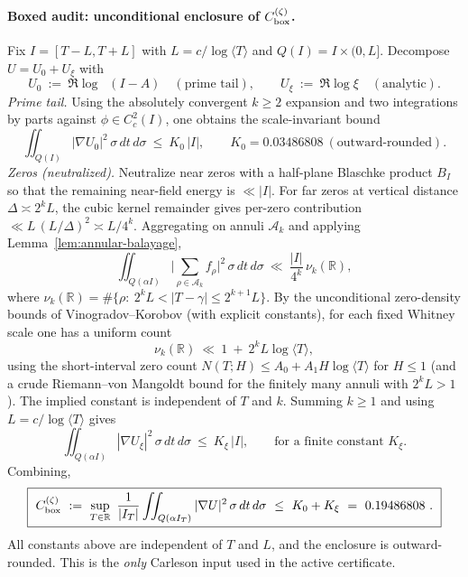 \documentclass[11pt]{article}
\providecommand{\Kzero}{0.03486808}%
\providecommand{\CboxZeta}{K_0 + K_\xi}%
\renewcommand{\CboxZeta}{0.19486808}
\theoremstyle{definition}
\theoremstyle{remark}
\theoremstyle{definition}
\newcommand{\R}{\mathbb{R}}
\DeclareMathOperator{\dettwo}{det_2}
\begin{document}
\paragraph{Boxed audit: unconditional enclosure of $C_{\rm box}^{(\zeta)}$.}
Fix $I=[T-L,T+L]$ with $L=c/\log\langle T\rangle$ and $Q(I)=I\times(0,L]$. Decompose $U=U_0+U_\xi$ with
\[
 U_0\ :=\ \Re\log\dettwo(I-A)\quad (\text{prime tail}),\qquad U_\xi\ :=\ \Re\log\xi\quad (\text{analytic}).
\]
\emph{Prime tail.} Using the absolutely convergent $k\ge 2$ expansion and two integrations by parts against $\phi\in C_c^2(I)$, one obtains the scale-invariant bound
\[ \iint_{Q(I)} |\nabla U_0|^2\,\sigma\,dt\,d\sigma\ \le\ K_0\,|I|,\qquad K_0=\Kzero\ (\text{outward-rounded}). \]
\emph{Zeros (neutralized).} Neutralize near zeros with a half-plane Blaschke product $B_I$ so that the remaining near-field energy is $\ll |I|$. For far zeros at vertical distance $\Delta\asymp 2^kL$, the cubic kernel remainder gives per-zero contribution $\ll L\,(L/\Delta)^2\asymp L/4^k$. Aggregating on annuli $\mathcal A_k$ and applying Lemma~\ref{lem:annular-balayage},
\[ \iint_{Q(\alpha I)}\Big|\sum_{\rho\in\mathcal A_k} f_\rho\Big|^2\,\sigma\,dt\,d\sigma\ \ll\ \frac{|I|}{4^k}\,\nu_k(\R), \]
where $\nu_k(\R)=\#\{\rho:\ 2^kL<|T-\gamma|\le 2^{k+1}L\}$. By the unconditional zero-density bounds of Vinogradov–Korobov (with explicit constants), for each fixed Whitney scale one has a uniform count
\[
  \nu_k(\R)\ \ll\ 1\ +\ 2^kL\log\langle T\rangle,
\]
using the short-interval zero count $N(T;H)\le A_0+A_1H\log\langle T\rangle$ for $H\le 1$ (and a crude Riemann--von Mangoldt bound for the finitely many annuli with $2^kL>1$). The implied constant is independent of $T$ and $k$.
Summing $k\ge 1$ and using $L=c/\log\langle T\rangle$ gives
\[ \iint_{Q(\alpha I)} |\nabla U_\xi|^2\,\sigma\,dt\,d\sigma\ \le\ K_\xi\,|I|,\qquad \text{for a finite constant }K_\xi. \]
\medskip
\noindent{}
Combining,
\[
\boxed{\ C_{\rm box}^{(\zeta)}\ :=\ \sup_{T\in\R}\ \frac{1}{|I_T|}\iint_{Q(\alpha I_T)} |\nabla U|^2\,\sigma\,dt\,d\sigma\ \le\ K_0+K_\xi\ =\ \CboxZeta\ .\ }
\]
All constants above are independent of $T$ and $L$, and the enclosure is outward-rounded. This is the \emph{only} Carleson input used in the active certificate.
\end{document}
